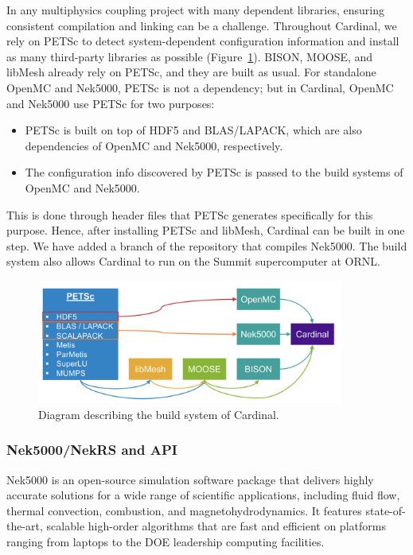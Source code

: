 In any multiphysics coupling project with many dependent libraries, ensuring consistent compilation and linking can be a challenge. Throughout Cardinal, we rely on PETSc to detect system-dependent configuration information and install as many third-party libraries as possible (Figure~\ref{f:build}). BISON, MOOSE, and libMesh already rely on PETSc, and they are built as usual. For standalone OpenMC and
Nek5000, PETSc is not a dependency; but in Cardinal, OpenMC and Nek5000 use PETSc for two purposes:
\begin{itemize}
\item PETSc is built on top of HDF5 and BLAS/LAPACK, which are also dependencies of OpenMC and Nek5000, respectively.
\item The configuration info discovered by PETSc is passed to the build systems of OpenMC and Nek5000.
\end{itemize}
This is done through header files that PETSc generates specifically for this purpose. Hence, after installing PETSc and libMesh, Cardinal can be built in one step.
We have added a branch of the repository that compiles Nek5000. The build system also allows Cardinal to run on the Summit supercomputer at ORNL.
\begin{figure}[!h]
\centering
\includegraphics[clip=true,width=0.9\textwidth]{Figures/build}
\caption{Diagram describing the build system of Cardinal.}
\label{f:build}
\end{figure}

\subsubsection{Nek5000/NekRS and API}

Nek5000 \cite{fischer2015nek5000} is an open-source simulation software package that delivers highly 
accurate solutions for a wide range of scientific applications, including fluid flow, thermal convection, 
combustion, and magnetohydrodynamics. It features state-of-the-art, scalable high-order algorithms that 
are fast and efficient on platforms ranging from laptops to the DOE leadership computing facilities.

